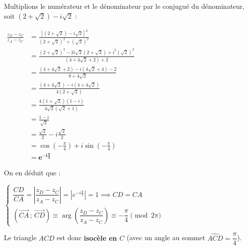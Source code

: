 \documentclass[12pt,a4paper]{article}
\begin{document}
\begin{enumerate}
\begin{enumerate}
        Multiplions le numérateur et le dénominateur par le conjugué du dénominateur, soit $(2 + \sqrt{2}) - i\sqrt{2}$ :
        
        $
        \begin{aligned}
            \frac{z_D - z_C}{z_A - z_C} &= \frac{\left[(2 + \sqrt{2}) - i\sqrt{2}\right]^2}{(2 + \sqrt{2})^2 + (\sqrt{2})^2}\\
            &= \frac{(2 + \sqrt{2})^2 - 2i\sqrt{2}(2 + \sqrt{2}) + i^2(\sqrt{2})^2}{(4 + 4\sqrt{2} + 2) + 2}\\
            &= \frac{(4 + 4\sqrt{2} + 2) - i(4\sqrt{2} + 4) - 2}{8 + 4\sqrt{2}}\\
            &= \frac{(4 + 4\sqrt{2}) - i(4 + 4\sqrt{2})}{4(2 + \sqrt{2})}\\
            &= \frac{4(1 + \sqrt{2})(1 - i)}{4\sqrt{2}(\sqrt{2} + 1)}\\
            &= \frac{1 - i}{\sqrt{2}}\\
            &= \frac{\sqrt{2}}{2} - i\frac{\sqrt{2}}{2}\\
            &= \cos\left(-\frac{\pi}{4}\right) + i\sin\left(-\frac{\pi}{4}\right)\\
            &= \mathbf{e^{-i\frac{\pi}{4}}}
        \end{aligned}
        $
        
        On en déduit que :
        
        $
        \begin{cases}
            \dfrac{CD}{CA} = \left|\dfrac{z_D - z_C}{z_A - z_C}\right| = \left|e^{-i\frac{\pi}{4}}\right| = 1 \implies CD = CA \\
            \left(\overrightarrow{CA}\,;\,\overrightarrow{CD}\right) \equiv \arg\left(\dfrac{z_D - z_C}{z_A - z_C}\right) \equiv -\dfrac{\pi}{4} \pmod{2\pi}
        \end{cases}
        $
        
        Le triangle $ACD$ est donc \textbf{isocèle en $C$} (avec un angle au sommet $\widehat{ACD} = \dfrac{\pi}{4}$).
    \end{enumerate}
\end{enumerate}
\end{document}
